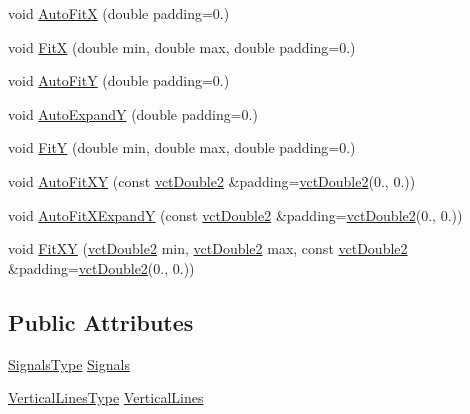 {\bf }\par
\begin{DoxyCompactItemize}
\item 
void \hyperlink{classvct_plot2_d_base_1_1_scale_ae59a2d3e1f34b425c488308a98744cf6}{Auto\+Fit\+X} (double padding=0.)
\item 
void \hyperlink{classvct_plot2_d_base_1_1_scale_a21172ea983325a8e9234b3766d36af25}{Fit\+X} (double min, double max, double padding=0.)
\item 
void \hyperlink{classvct_plot2_d_base_1_1_scale_aee7ab703d38626e8f9ec1071c291180e}{Auto\+Fit\+Y} (double padding=0.)
\item 
void \hyperlink{classvct_plot2_d_base_1_1_scale_a3e2087e860cd0a3529d99c27fd8d4b52}{Auto\+Expand\+Y} (double padding=0.)
\item 
void \hyperlink{classvct_plot2_d_base_1_1_scale_a1653c8301f2b869b07b862b97c66558f}{Fit\+Y} (double min, double max, double padding=0.)
\item 
void \hyperlink{classvct_plot2_d_base_1_1_scale_ab8fe8d00ed232507fdb75815d34b98bd}{Auto\+Fit\+X\+Y} (const \hyperlink{vct_fixed_size_vector_types_8h_afc0fdcc41cbe8b043747612501610812}{vct\+Double2} \&padding=\hyperlink{vct_fixed_size_vector_types_8h_afc0fdcc41cbe8b043747612501610812}{vct\+Double2}(0., 0.))
\item 
void \hyperlink{classvct_plot2_d_base_1_1_scale_a03dcf9af74b2c77604707595ae00acf8}{Auto\+Fit\+X\+Expand\+Y} (const \hyperlink{vct_fixed_size_vector_types_8h_afc0fdcc41cbe8b043747612501610812}{vct\+Double2} \&padding=\hyperlink{vct_fixed_size_vector_types_8h_afc0fdcc41cbe8b043747612501610812}{vct\+Double2}(0., 0.))
\item 
void \hyperlink{classvct_plot2_d_base_1_1_scale_ac598d8ba71af64d422a46a3dea22bb25}{Fit\+X\+Y} (\hyperlink{vct_fixed_size_vector_types_8h_afc0fdcc41cbe8b043747612501610812}{vct\+Double2} min, \hyperlink{vct_fixed_size_vector_types_8h_afc0fdcc41cbe8b043747612501610812}{vct\+Double2} max, const \hyperlink{vct_fixed_size_vector_types_8h_afc0fdcc41cbe8b043747612501610812}{vct\+Double2} \&padding=\hyperlink{vct_fixed_size_vector_types_8h_afc0fdcc41cbe8b043747612501610812}{vct\+Double2}(0., 0.))
\end{DoxyCompactItemize}

\subsection*{Public Attributes}
\begin{DoxyCompactItemize}
\item 
\hyperlink{classvct_plot2_d_base_1_1_scale_aecdc247557c6ec3b7976596b42a4bc27}{Signals\+Type} \hyperlink{classvct_plot2_d_base_1_1_scale_aaf49bb6b91be117e05da71e7aa19fdc0}{Signals}
\item 
\hyperlink{classvct_plot2_d_base_1_1_scale_acd4d4d528f1381dfd1145ceec34b25ba}{Vertical\+Lines\+Type} \hyperlink{classvct_plot2_d_base_1_1_scale_abf66269635d563e367c3afeba8334053}{Vertical\+Lines}
\end{DoxyCompactItemize}
